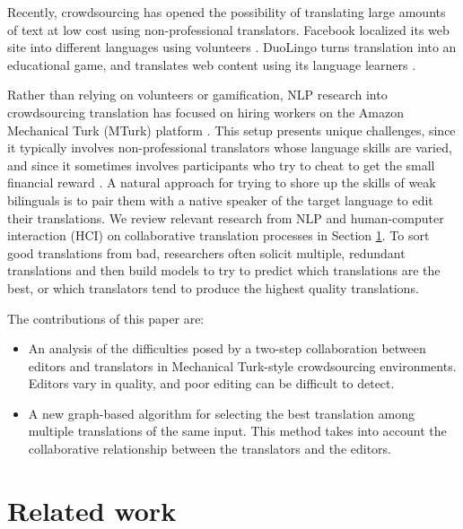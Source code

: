 \documentclass[11pt]{article}
\begin{document}
Recently, crowdsourcing has opened the possibility of translating large amounts of text at low cost using non-professional translators.  Facebook localized its web site into different languages using volunteers \cite{Facebook-Crowdsourced-Translation}.  DuoLingo turns translation into an educational game, and translates web content using its language learners \cite{vonAhn:2013:DLL:2449396.2449398}.

Rather than relying on volunteers or gamification, NLP research into crowdsourcing translation has focused on hiring workers on the Amazon Mechanical Turk  (MTurk) platform   \cite{Callison-Burch2009}.  This setup presents unique challenges, since it typically involves non-professional translators whose language skills are varied, and since it sometimes involves participants who try to cheat to get the small financial reward \cite{zaidan-callisonburch:2011:ACL-HLT2011a}.
A natural approach for trying to shore up the skills of weak bilinguals is to pair them with a native speaker of the target language to edit their translations.
We review relevant research from NLP and human-computer interaction (HCI) on collaborative translation processes in Section \ref{related-work}.
To sort good translations from bad, researchers often solicit multiple, redundant translations and then build models to try to predict which translations are the best, or which translators tend to produce the highest quality translations.

The contributions of this paper are:
\begin{itemize}
\item An analysis of the difficulties posed by a two-step collaboration between editors and translators in Mechanical Turk-style crowdsourcing environments.  Editors vary in quality, and poor editing can be difficult to detect.
\item A new graph-based algorithm for selecting the best translation among multiple translations of the same input.  This method takes into account the collaborative relationship between the translators and the editors.
\end{itemize}


\section{Related work}\label{related-work}
\end{document}
